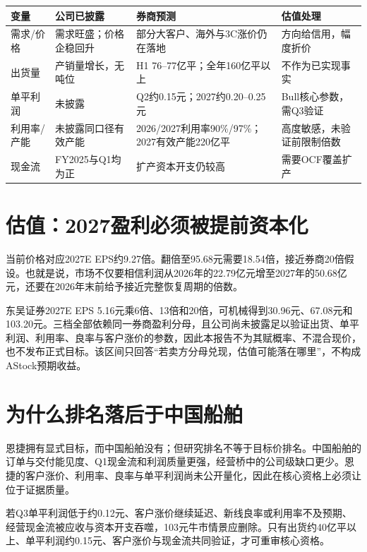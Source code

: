 \begin{exhibitbox}
\small
\begin{tabularx}{\exhibitboxwidth}{L{3cm} L{3.4cm} L{3.4cm} X}
\toprule
变量 & 公司已披露 & 券商预测 & 估值处理 \\
\midrule
需求/价格 & 需求旺盛；价格企稳回升 & 部分大客户、海外与3C涨价仍在落地 & 方向给信用，幅度折价 \\
出货量 & 产销量增长，无吨位 & H1 76--77亿平；全年160亿平以上 & 不作为已实现事实 \\
单平利润 & 未披露 & Q2约0.15元；2027约0.20--0.25元 & Bull核心参数，需Q3验证 \\
利用率/产能 & 未披露同口径有效产能 & 2026/2027利用率90\%/97\%；2027有效产能220亿平 & 高度敏感，未验证前限制倍数 \\
现金流 & FY2025与Q1均为正 & 扩产资本开支仍较高 & 需要OCF覆盖扩产 \\
\bottomrule
\end{tabularx}
\end{exhibitbox}

\section{估值：2027盈利必须被提前资本化}

当前价格对应2027E EPS约9.27倍。翻倍至95.68元需要18.54倍，接近券商20倍假设。也就是说，市场不仅要相信利润从2026年的22.79亿元增至2027年的50.68亿元，还要在2026年末前给予接近完整恢复周期的倍数。

东吴证券2027E EPS 5.16元乘6倍、13倍和20倍，可机械得到30.96元、67.08元和103.20元。三档全部依赖同一券商盈利分母，且公司尚未披露足以验证出货、单平利润、利用率、良率与客户涨价的参数，因此本报告不为其赋概率、不混合现价，也不发布正式目标。该区间只回答“若卖方分母兑现，估值可能落在哪里”，不构成AStock预期收益。

\section{为什么排名落后于中国船舶}

恩捷拥有显式目标，而中国船舶没有；但研究排名不等于目标价排名。中国船舶的订单与交付能见度、Q1现金流和利润质量更强，经营桥中的公司级缺口更少。恩捷的客户涨价、利用率、良率与单平利润尚未公开量化，因此在核心资格上必须让位于证据质量。

\begin{riskbox}[降级条件]
若Q3单平利润低于约0.12元、客户涨价继续延迟、新线良率或利用率不及预期、经营现金流被应收与资本开支吞噬，103元牛市情景应删除。只有出货约40亿平以上、单平利润约0.15元、客户涨价与现金流共同验证，才可重审核心资格。
\end{riskbox}

\clearpage
